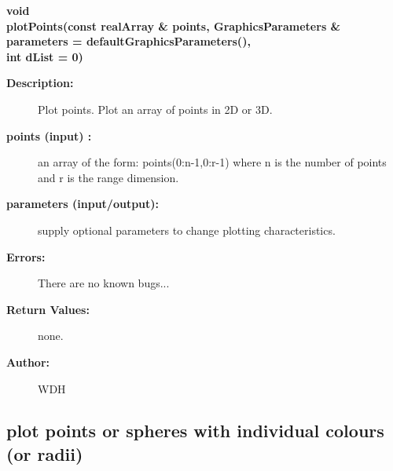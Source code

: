 \begin{flushleft} \textbf{%
void  \\ 
\settowidth{\GLGraphicsInterfaceIncludeArgIndent}{plotPoints(}%
plotPoints(const realArray \& points, GraphicsParameters \& parameters  = defaultGraphicsParameters(),\\ 
\hspace{\GLGraphicsInterfaceIncludeArgIndent}int dList  = 0)
}\end{flushleft}
\begin{description}
\item[{\bf Description:}] 
   Plot points. Plot an array of points in 2D or 3D. 
 
\item[{\bf points (input) :}]  an array of the form: points(0:n-1,0:r-1) where n is the number
    of points and r is the range dimension. 

\item[{\bf parameters (input/output):}]  supply optional parameters to change
    plotting characteristics.
\item[{\bf Errors:}]   There are no known bugs...
\item[{\bf Return Values:}]  none.

\item[{\bf Author:}]  WDH
\end{description}
\subsection{plot points or spheres with individual colours (or radii)}
 
